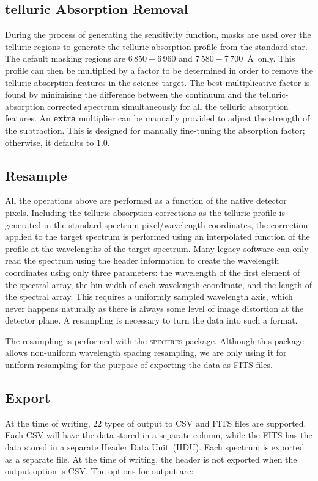 \documentclass[linenumbers, twocolumn]{aastex631}
\begin{document}
\subsection{telluric Absorption Removal}
During the process of generating the sensitivity function, masks are used
over the telluric regions to generate the telluric absorption
profile from the standard star. The default masking regions are $6\,850-6\,960$
and $7\,580-7\,700$\ \AA\ only. This profile can then be multiplied
by a factor to be determined in order to remove the telluric absorption
features in the science target. The best multiplicative factor is found
by minimising the difference between the continuum and the telluric-absorption
corrected spectrum simultaneously for all the telluric absorption features.
An \textbf{extra} multiplier can be manually provided to adjust the
strength of the subtraction. This is designed for manually fine-tuning the
absorption factor; otherwise, it defaults to $1.0$.

\subsection{Resample}
All the operations above are performed as a function of the native detector
pixels. Including the telluric absorption corrections as the telluric profile
is generated in the standard spectrum pixel/wavelength coordinates, the
correction applied to the target spectrum is performed using an interpolated
function of the profile at the wavelengths of the target spectrum. Many legacy
software can only read the spectrum using the header information to create
the wavelength coordinates using only three parameters: the wavelength of the
first element of the spectral array, the bin width of each wavelength
coordinate, and the length of the spectral array. This requires a uniformly
sampled wavelength axis, which never happens naturally as there is always some
level of image distortion at the detector plane. A resampling is necessary
to turn the data into such a format.

The resampling is performed with the \textsc{spectres} package. Although
this package allows non-uniform wavelength spacing resampling, we are only
using it for uniform resampling for the purpose of exporting the data as FITS
files.

\subsection{Export}
At the time of writing, 22 types of output to CSV and FITS files are supported.
Each CSV will have the data stored in a separate column, while the FITS has
the data stored in a separate Header Data Unit~(HDU). Each spectrum is exported
as a separate file. At the time of writing, the header is not exported when the
output option is CSV. The options for output are:
\end{document}
